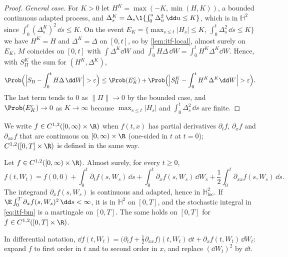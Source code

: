 \begin{proof}
\emph{General case.} For $K>0$ let $H^K=\max(-K,\min(H,K))$, a bounded continuous adapted
process, and $\Delta^K_s=\Delta_s\1\{\int_0^s\Delta_u^2\,\dd u\le K\}$, which is in $\mathbb H^2$
since $\int_0^t(\Delta^K_s)^2\,\dd s\le K$. On the event
$E_K=\{\max_{s\le t}|H_s|\le K,\ \int_0^t\Delta_s^2\,\dd s\le K\}$ we have $H^K=H$ and
$\Delta^K=\Delta$ on $[0,t]$, so by \cref{lem:itf-local}, almost surely on $E_K$, $M$ coincides on $[0,t]$ with
$\int\Delta^K\dd W$ and $\int_0^tH\Delta\,\dd W=\int_0^tH^K\Delta^K\dd W$. Hence, with $S^K_\Pi$ the
sum for $(H^K,\Delta^K)$,
\[
  \Prob\Big(\Big|S_\Pi-\int_0^tH\Delta\,\dd W\Big|>\varepsilon\Big)
  \le\Prob(E_K^c)+\Prob\Big(\Big|S^K_\Pi-\int_0^tH^K\Delta^K\dd W\Big|>\varepsilon\Big).
\]
The last term tends to $0$ as $\|\Pi\|\to0$ by the bounded case, and $\Prob(E_K^c)\to0$ as
$K\to\infty$ because $\max_{s\le t}|H_s|$ and $\int_0^t\Delta_s^2\,\dd s$ are finite.
\end{proof}

We write $f\in C^{1,2}([0,\infty)\times\R)$ when $f(t,x)$ has partial derivatives $\partial_tf$,
$\partial_xf$ and $\partial_{xx}f$ that are continuous on $[0,\infty)\times\R$ (one-sided in $t$
at $t=0$); $C^{1,2}([0,T]\times\R)$ is defined in the same way.

\begin{theorem}\label{thm:itf-bm}
Let $f\in C^{1,2}([0,\infty)\times\R)$. Almost surely, for every $t\ge0$,
\begin{equation}\label{eq:itf-bm}
  f(t,W_t)=f(0,0)+\int_0^t\partial_tf(s,W_s)\,\dd s+\int_0^t\partial_xf(s,W_s)\,\dd W_s
  +\frac12\int_0^t\partial_{xx}f(s,W_s)\,\dd s .
\end{equation}
The integrand $\partial_xf(s,W_s)$ is continuous and adapted, hence in $\mathbb H^2_{\mathrm{loc}}$.
If $\E\int_0^T\partial_xf(s,W_s)^2\,\dd s<\infty$, it is in $\mathbb H^2$ on $[0,T]$, and the
stochastic integral in \eqref{eq:itf-bm} is a martingale on $[0,T]$. The same holds on $[0,T]$
for $f\in C^{1,2}([0,T]\times\R)$.
\end{theorem}

In differential notation,
$\dd f(t,W_t)=\big(\partial_tf+\frac12\partial_{xx}f\big)(t,W_t)\,\dd t+\partial_xf(t,W_t)\,\dd W_t$:
expand $f$ to first order in $t$ and to second order in $x$, and replace $(\dd W_t)^2$ by $\dd t$.

